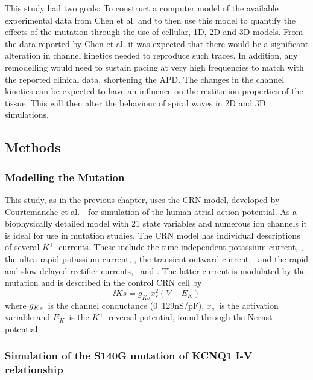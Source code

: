 This study had two goals: To construct a computer model of the available
experimental data from Chen et al. and to then use this model to quantify the
effects of the mutation through the use of cellular, 1D, 2D and 3D models.
From the data reported by Chen et al. it was expected that there would be a
significant alteration in channel kinetics needed to reproduce such traces.
In addition, any remodelling would need to sustain pacing at very high
frequencies to match with the reported clinical data, shortening the APD.
The changes in the channel kinetics can be expected to have an influence on the
restitution properties of the tissue.
This will then alter the behaviour of spiral waves in 2D and 3D simulations.

\subsection{Methods}

\subsubsection{Modelling the Mutation}

This study, as in the previous chapter, uses the CRN model, developed by
Courtemanche et al.~\cite{CRN98}\ for simulation of the human atrial action
potential.
As a biophysically detailed model with 21 state variables and numerous ion
channels it is ideal for use in mutation studies.
The CRN model has individual descriptions of several $K^{+}$\ currents.
These include the time-independent potassium current, , the ultra-rapid
potassium current, , the transient outward current, \ and the
rapid and slow delayed rectifier currents, \ and .
The latter current is modulated by the mutation and is described in the control
CRN cell by
\begin{equation}
\label{atrium:iks_con}
\ii{Ks} = g_{Ks}x_{s}^{2}\left(V-E_{K}\right)
\end{equation}
where $g_{\tiny{Ks}}$\ is the channel conductance (\unit{0.129}{nS/pF}), $x_{s}$\ is
the activation variable and $E_{K}$\ is the $K^{+}$\ reversal potential, found
through the Nernst potential.

\subsubsection{Simulation of the S140G mutation of KCNQ1 I-V relationship}

